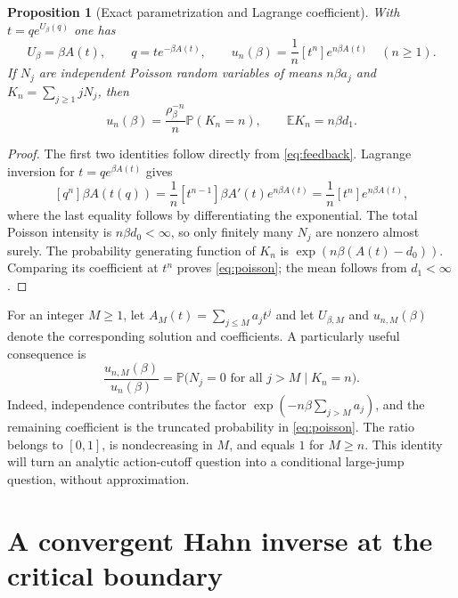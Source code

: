 \documentclass[11pt,a4paper]{article}
\numberwithin{equation}{section}
\newtheorem{proposition}[theorem]{Proposition}
\theoremstyle{definition}
\theoremstyle{remark}
\newcommand{\E}{\mathbb E}
\newcommand{\Prob}{\mathbb P}
\begin{document}
\begin{proposition}[Exact parametrization and Lagrange coefficient]
\label{prop:exact}
With $t=qe^{U_\beta(q)}$ one has
\begin{equation}\label{eq:parametric}
 U_\beta=\beta A(t),\qquad q=t e^{-\beta A(t)},\qquad
 u_n(\beta)=\frac1n[t^n]e^{n\beta A(t)}\quad(n\ge1).
\end{equation}
If $N_j$ are independent Poisson random variables of means $n\beta a_j$
and $K_n=\sum_{j\ge1}jN_j$, then
\begin{equation}\label{eq:poisson}
 u_n(\beta)=\frac{\rho_\beta^{-n}}n\Prob(K_n=n),\qquad
 \E K_n=n\beta d_1.
\end{equation}
\end{proposition}
\begin{proof}
The first two identities follow directly from \eqref{eq:feedback}.
Lagrange inversion for $t=q e^{\beta A(t)}$ gives
\[
 [q^n]\beta A(t(q))
 =\frac1n[t^{n-1}]\beta A'(t)e^{n\beta A(t)}
 =\frac1n[t^n]e^{n\beta A(t)},
\]
where the last equality follows by differentiating the exponential.
The total Poisson intensity is $n\beta d_0<\infty$, so only finitely many
$N_j$ are nonzero almost surely. The probability generating function of
$K_n$ is $\exp(n\beta(A(t)-d_0))$. Comparing its coefficient at $t^n$
proves \eqref{eq:poisson}; the mean follows from $d_1<\infty$.
\end{proof}

For an integer $M\ge1$, let $A_M(t)=\sum_{j\le M}a_jt^j$ and let
$U_{\beta,M}$ and $u_{n,M}(\beta)$ denote the corresponding solution and
coefficients. A particularly useful consequence is
\begin{equation}\label{eq:conditional}
 \frac{u_{n,M}(\beta)}{u_n(\beta)}
 =\Prob\bigl(N_j=0\text{ for all }j>M\mid K_n=n\bigr).
\end{equation}
Indeed, independence contributes the factor
$\exp(-n\beta\sum_{j>M}a_j)$, and the remaining coefficient is the
truncated probability in \eqref{eq:poisson}. The ratio belongs to $[0,1]$,
is nondecreasing in $M$, and equals $1$ for $M\ge n$. This identity will
turn an analytic action-cutoff question into a conditional large-jump
question, without approximation.

\section{A convergent Hahn inverse at the critical boundary}
\label{sec:hahn}
\end{document}
